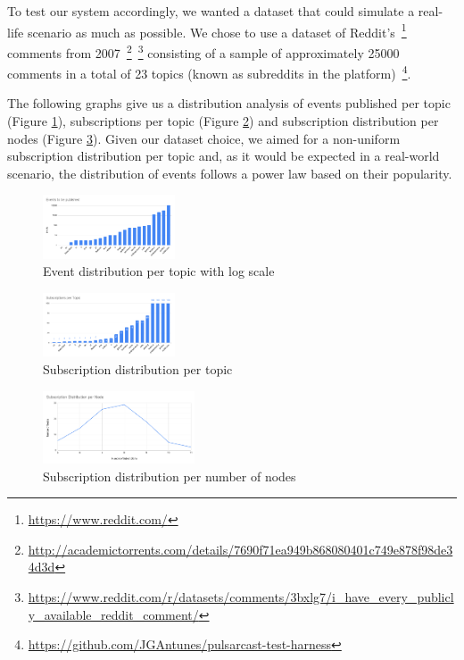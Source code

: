 To test our system accordingly, we wanted a dataset that could simulate a
real-life scenario as much as possible. We chose to use a dataset of
Reddit's~\footnote{\url{https://www.reddit.com/}} comments from
2007~\footnote{\url{http://academictorrents.com/details/7690f71ea949b868080401c749e878f98de34d3d}}~\footnote{\url{https://www.reddit.com/r/datasets/comments/3bxlg7/i_have_every_publicly_available_reddit_comment/}}
consisting of a sample of approximately 25000 comments in a total of 23 topics
(known as subreddits in the platform)~\footnote{\url{https://github.com/JGAntunes/pulsarcast-test-harness}}.

The following graphs give us a distribution analysis of events published per
topic (Figure \ref{fig:events-to-be-publisher-per-topic}), subscriptions per
topic (Figure \ref{fig:subscriptions-per-topic}) and subscription distribution
per nodes (Figure \ref{fig:subscription-distribution-per-node}). Given our
dataset choice, we aimed for a non-uniform subscription distribution per topic
and, as it would be expected in a real-world scenario, the distribution of
events follows a power law based on their popularity. 

\begin{figure}[!htb]
  \centering
  \includegraphics[width=0.35\textwidth]{img/events-to-be-publisher-per-topic.png}
  \caption{Event distribution per topic with log scale}
  \label{fig:events-to-be-publisher-per-topic}
\end{figure}

\begin{figure}[!htb]
  \centering
  \includegraphics[width=0.35\textwidth]{img/subscriptions-per-topic.png}
  \caption{Subscription distribution per topic}
  \label{fig:subscriptions-per-topic}
\end{figure}

\begin{figure}[!htb]
  \centering
  \includegraphics[width=0.4\textwidth]{img/subscription-distribution-per-node.png}
  \caption{Subscription distribution per number of nodes}
  \label{fig:subscription-distribution-per-node}
\end{figure}

